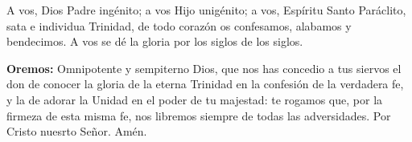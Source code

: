 \documentclass[10pt]{article}
\begin{document}
\begin{multicols}{2}
      A vos, Dios Padre ingénito; a vos Hijo unigénito; a vos, Espíritu Santo Paráclito, sata e individua Trinidad, de todo corazón os confesamos, alabamos y bendecimos. A vos se dé
      la gloria por los siglos de los siglos.

      \newline

      \textbf{Oremos:} Omnipotente y sempiterno Dios, que nos has concedio a tus siervos el don de conocer la gloria de la eterna Trinidad en la confesión de la verdadera fe,
      y la de adorar la Unidad en el poder de tu majestad: te rogamos que, por la firmeza de esta misma fe, nos libremos siempre de todas las adversidades. Por Cristo nuesrto Señor.
      Amén.

\end{multicols}
\end{document}
